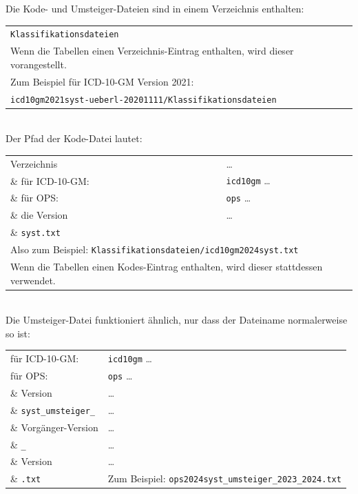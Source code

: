 Die Kode- und Umsteiger-Dateien sind in einem Verzeichnis enthalten:

\begingroup
\renewcommand{\arraystretch}{1.0}
\begin{tabular}{l}
\texttt{Klassifikationsdateien} \\
Wenn die Tabellen einen Verzeichnis-Eintrag enthalten, wird dieser vorangestellt. \\
Zum Beispiel für ICD-10-GM Version 2021: \\
\texttt{icd10gm2021syst-ueberl-20201111/Klassifikationsdateien} \\
\end{tabular}
\endgroup \\

Der Pfad der Kode-Datei lautet:

\begingroup
\renewcommand{\arraystretch}{1.0}
\begin{tabular}{p{4cm}l}
Verzeichnis & \ldots \\
\& für ICD-10-GM: & \texttt{icd10gm} \ldots \\
\& für OPS: & \texttt{ops} \ldots \\
\& die Version & \ldots\\
\& \texttt{syst.txt} \\
\multicolumn{2}{l}{Also zum Beispiel: \texttt{Klassifikationsdateien/icd10gm2024syst.txt}} \\
\multicolumn{2}{l}{Wenn die Tabellen einen Kodes-Eintrag enthalten, wird dieser stattdessen verwendet.} \\
\end{tabular}
\endgroup \\

Die Umsteiger-Datei funktioniert ähnlich, nur dass der Dateiname normalerweise so ist:

\begingroup
\renewcommand{\arraystretch}{1.0}
\begin{tabular}{p{4cm}l}
für ICD-10-GM: & \texttt{icd10gm} \ldots\\
für OPS: & \texttt{ops} \ldots\\
\& Version & \ldots\\
\& \texttt{syst\_umsteiger\_} & \ldots\\
\& Vorgänger-Version & \ldots\\
\& \texttt{\_} & \ldots\\
\& Version & \ldots\\
\& \texttt{.txt} & Zum Beispiel: \texttt{ops2024syst\_umsteiger\_2023\_2024.txt}\\
\end{tabular}
\endgroup \\

